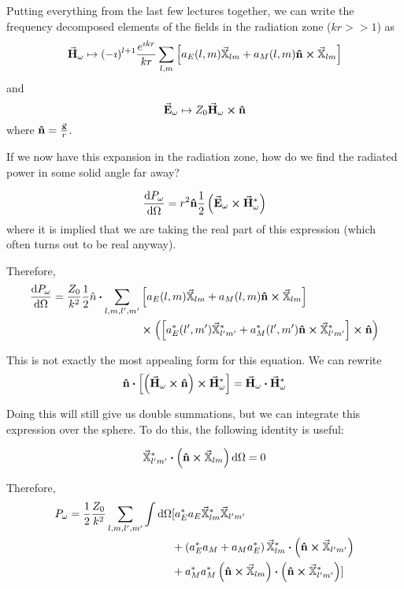 \documentclass[a4paper,twoside,master.tex]{subfiles}
\begin{document}

Putting everything from the last few lectures together, we can write the frequency decomposed elements of the fields in the radiation zone ($ kr>>1 $) as
\begin{equation}
    \va{H}_{\omega} \mapsto (- \imath)^{l+1} \frac{e^{\imath kr}}{kr} \sum_{l,m} \left[ a_E(l,m) \va{\mathbb{X}}_{lm} + a_M(l,m) \vu{n} \cross \va{\mathbb{X}}_{lm} \right]
\end{equation}
and
\begin{equation}
    \va{E}_{\omega} \mapsto Z_0 \va{H}_{\omega} \cross \vu{n}
\end{equation}
where $ \vu{n} = \frac{ \va{x}}{r} $.

If we now have this expansion in the radiation zone, how do we find the radiated power in some solid angle far away?

\begin{equation}
    \dv{P_{\omega}}{\Omega} = r^2 \vu{n} \frac{1}{2} \left( \va{E}_{\omega} \cross \va{H}^*_{\omega} \right)
\end{equation}
where it is implied that we are taking the real part of this expression (which often turns out to be real anyway).

Therefore,
\begin{align}
    \dv{P_{\omega}}{\Omega} = \frac{Z_0}{k^2} \frac{1}{2} \hat{n} \vdot \sum_{l,m,l',m'} &\left[ a_E(l,m) \va{\mathbb{X}}_{lm} + a_M(l,m) \vu{n} \cross \va{\mathbb{X}}_{lm} \right] \\
    &\cross \left( \left[ a_E^*(l',m') \va{\mathbb{X}}^*_{l'm'} + a_M^*(l',m') \vu{n} \cross \va{\mathbb{X}}^*_{l'm'} \right] \cross \vu{n} \right)
\end{align}

This is not exactly the most appealing form for this equation. We can rewrite
\begin{equation}
    \vu{n} \vdot \left[ \left( \va{H}_{\omega} \cross \vu{n} \right) \cross \va{H}_{\omega}^* \right]= \va{H}_{\omega} \vdot \va{H}_{\omega}^*
\end{equation}

Doing this will still give us double summations, but we can integrate this expression over the sphere. To do this, the following identity is useful:
\begin{lemma}
    \begin{equation}
        \va{\mathbb{X}}_{l'm'}^* \vdot \left( \vu{n} \cross \va{\mathbb{X}}_{lm} \right) \dd{\Omega} = 0
    \end{equation}
\end{lemma}
Therefore,
\begin{align}
    P_{\omega} = \frac{1}{2} \frac{Z_0}{k^2} \sum_{l,m,l',m'} \int \dd{\Omega} &[ a_E^* a_E \va{\mathbb{X}}_{lm}^* \va{\mathbb{X}}_{l'm'} \\ 
        &+ \left( a_E^* a_M + a_M a_E^* \right) \va{\mathbb{X}}_{lm}^* \vdot \left( \vu{n} \cross \va{\mathbb{X}}_{l'm'} \right) \\
    &+ a_M^* a_M^* \left( \vu{n} \cross \va{\mathbb{X}}_{lm} \right) \vdot \left( \vu{n} \cross \va{\mathbb{X}}_{l'm'}^* \right) ]
\end{align}
\end{document}
